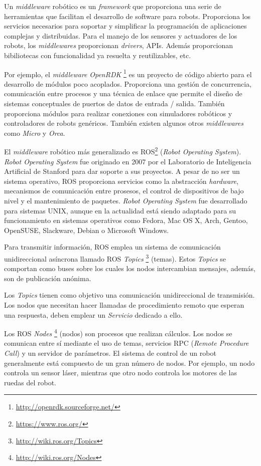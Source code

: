 \documentclass[a4paper, 12pt]{book}
\begin{document}
Un \textit{middleware} robótico es un \textit{framework} que proporciona una serie de herramientas que facilitan el desarrollo de software para robots. Proporciona los servicios necesarios para soportar y simplificar la programación de aplicaciones complejas y distribuidas. Para el manejo de los sensores y actuadores de los robots, los \textit{middlewares} proporcionan \textit{drivers}, APIs. Además proporcionan bibiliotecas con funcionalidad ya resuelta y reutilizables, etc.

Por ejemplo, el \emph{middleware} \emph{OpenRDK} \footnote{\url{http://openrdk.sourceforge.net/}} es un proyecto de código abierto para el desarrollo de módulos poco acoplados. Proporciona una gestión de concurrencia, comunicación entre procesos y una técnica de enlace que permite el diseño de sistemas conceptuales de puertos de datos de entrada / salida. También proporciona módulos para realizar conexiones con simuladores robóticos y controladores de robots genéricos. También existen algunos otros \emph{middlewares} como \emph{Micro} y \emph{Orca}.

El \textit{middleware} robótico más generalizado es ROS\footnote{\url{https://www.ros.org/}}
 (\textit{Robot Operating System}). \textit{Robot Operating System} fue originado en 2007 por el Laboratorio de Inteligencia Artificial de Stanford para dar soporte a sus proyectos. A pesar de no ser un sistema operativo, ROS proporciona servicios como la abstracción \textit{hardware}, mecanismos de comunicación entre prosesos, el control de dispositivos de bajo nivel y el mantenimiento de paquetes. \textit{Robot Operating System} fue desarrollado para sistemas UNIX, aunque en la actualidad está siendo adaptado para su funcionamiento en sistemas operativos como Fedora, Mac OS X, Arch, Gentoo, OpenSUSE, Slackware, Debian o Microsoft Windows.
 
Para transmitir información, ROS emplea un sistema de comunicación unidireccional asíncrona llamado ROS \emph{Topics} \footnote{\url{http://wiki.ros.org/Topics}} (temas). Estos \emph{Topics} se comportan como buses sobre los cuales los nodos intercambian mensajes, además, son de publicación anónima.

Los \emph{Topics} tienen como objetivo una comunicación unidireccional de transmisión. Los nodos que necesitan hacer llamadas de procedimiento remoto que esperan una respuesta, deben emplear un \emph{Servicio} dedicado a ello.

Los ROS \emph{Nodes} \footnote{\url{http://wiki.ros.org/Nodes}} (nodos) son procesos que realizan cálculos. Los nodos se comunican entre sí mediante el uso de temas, servicios RPC (\emph{Remote Procedure Call}) y un servidor de parámetros. El sistema de control de un robot generalmente está compuesto de un gran número de nodos. Por ejemplo, un nodo controla un sensor láser, mientras que otro nodo controla los motores de las ruedas del robot.
\end{document}
